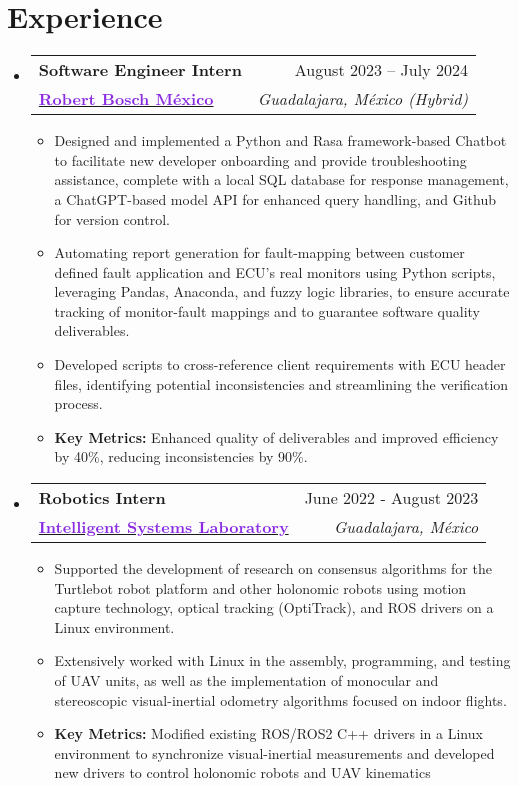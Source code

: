 \documentclass[a4paper,11pt]{article}
\makeatletter
\newcommand{\resumeItem}[1]{
  \item\small{
    {#1 \vspace{-2pt}}
  }
}
\newcommand{\resumeItemNoBullet}[1]{
  \item[]\small{
    {#1 \vspace{-2pt}}
  }
}
\newcommand{\resumeSubheadingNoItalics}[4]{
  \vspace{-2pt}\item
    \begin{tabular*}{1\textwidth}[t]{l@{\extracolsep{\fill}}r}
      \textbf{#1} & #2 \\
      \small#3 & \textit{\small #4} \\
    \end{tabular*}\vspace{-2pt}
}
\newcommand{\resumeSubHeadingListStart}{\begin{itemize}[leftmargin=0in, label={}]}
\newcommand{\resumeSubHeadingListEnd}{\end{itemize}}
\newcommand{\resumeItemListStart}{\begin{itemize}[leftmargin=0.15in, nosep]}
\newcommand{\resumeItemListEnd}{\end{itemize}\vspace{-2pt}}
\makeatother
\begin{document}
\section{\Large{Experience}}
  \resumeSubHeadingListStart
    \resumeSubheadingNoItalics
      {\large Software Engineer Intern}{August 2023 -- July 2024}
      {\href{https://bosch.com.mx}{\textcolor{BlueViolet}{\textbf{\large{Robert Bosch México}}}}}{Guadalajara, México (Hybrid)}
      \resumeItemListStart
        \resumeItem{Designed and implemented a Python and Rasa framework-based Chatbot to facilitate new developer onboarding and provide troubleshooting assistance, complete with a local SQL database for response management, a ChatGPT-based model API for enhanced query handling, and Github for version control.}
        \resumeItem{Automating report generation for fault-mapping between customer defined fault application and ECU's  real monitors using Python scripts, leveraging Pandas, Anaconda, and fuzzy logic libraries, to ensure accurate tracking of monitor-fault mappings and to guarantee software quality deliverables.}
        \resumeItem{Developed scripts to cross-reference client requirements with ECU header files, identifying potential inconsistencies and streamlining the verification process.}
        \resumeItemNoBullet{\textbf{Key Metrics:} Enhanced quality of deliverables and improved efficiency by 40\%, reducing inconsistencies by 90\%.}
      \resumeItemListEnd
    \vspace{-2pt}
    \resumeSubheadingNoItalics
      {\large Robotics Intern}{June 2022 - August 2023}
      {\href{https://www.cucei.udg.mx/carreras/robotica/es/laboratorios/ciber-fisicos}{\textcolor{BlueViolet}{\textbf{\large{Intelligent Systems Laboratory}}}}}{Guadalajara, México}
      \resumeItemListStart
        \resumeItem{Supported the development of research on consensus algorithms for the Turtlebot robot platform and other holonomic robots using motion capture technology, optical tracking (OptiTrack), and ROS drivers on a Linux environment.}
        \resumeItem{Extensively worked with Linux in the assembly, programming, and testing of UAV units, as well as the implementation of monocular and stereoscopic visual-inertial odometry algorithms focused on indoor flights.}
        \resumeItemNoBullet{\textbf{Key Metrics:} Modified existing ROS/ROS2 C++ drivers in a Linux environment to synchronize visual-inertial measurements and developed new drivers to control holonomic robots and UAV kinematics}
      \resumeItemListEnd
  \resumeSubHeadingListEnd
\vspace{-12pt}
\end{document}
